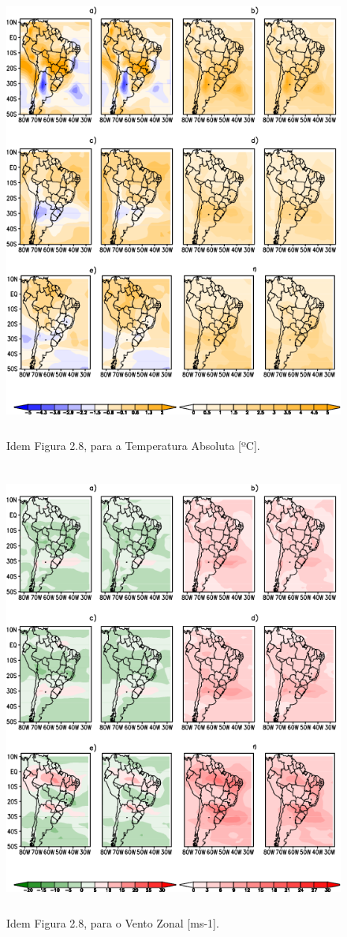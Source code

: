 \begin{figure}[!hbp]
\centering
\includegraphics[height=15cm]{./figs/campo_vies_eqm-temp.png}
\caption{Idem Figura 2.8, para a Temperatura Absoluta [ºC].}
\label{fig49}
\end{figure}

\begin{figure}[!hbp]
\centering
\includegraphics[height=15cm]{./figs/campo_vies_eqm-uvel.png}
\caption{Idem Figura 2.8, para o Vento Zonal [ms-1].}
\label{fig50}
\end{figure}

